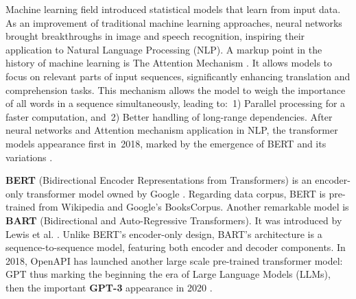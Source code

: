 Machine learning field introduced statistical models that learn from input data. As an improvement of traditional machine learning approaches, neural networks brought breakthroughs in image and speech recognition, inspiring their application to Natural Language Processing (NLP). A markup point in the history of machine learning is The Attention Mechanism \cite{10.5555/3295222.3295349}. It allows models to focus on relevant parts of input sequences, significantly enhancing translation and comprehension tasks.
This mechanism allows the model to weigh the importance of all words in a sequence simultaneously, leading to:~1) Parallel processing for a faster computation, and~2) Better handling of long-range dependencies. After neural networks and Attention mechanism application in NLP, the transformer models appearance first in~2018, marked by the emergence of BERT and its variations \cite{DBLP:journals/corr/abs-2302-09419}.


\textbf{BERT} (Bidirectional Encoder Representations from Transformers) is an encoder-only transformer model owned by Google \cite{devlin2019bertpretrainingdeepbidirectional}. Regarding data corpus, BERT is pre-trained from  Wikipedia and Google’s BooksCorpus. Another remarkable model is \textbf{BART} (Bidirectional and Auto-Regressive Transformers). It was introduced by Lewis et al. \cite{lewis2019bartdenoisingsequencetosequencepretraining}.
Unlike BERT’s encoder-only design, BART’s architecture is a sequence-to-sequence model, featuring both encoder and decoder components.
In 2018, OpenAPI has launched another large scale pre-trained transformer model: GPT thus marking the beginning the era of Large Language Models (LLMs), then the important \textbf{GPT-3} appearance in 2020 \cite{10113601}.


 


